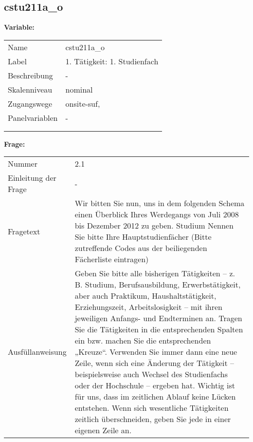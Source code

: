 	
	
	\subsection{cstu211a\_o}
	\label{subSection:cstu211a_o}

	\noindent\textbf{Variable:}\\
		\begin{tabular}{lL{11.3cm}}
			\label{tableVariable:cstu211a_o}
			Name & cstu211a\_o \\
			Label & 1. Tätigkeit: 1. Studienfach \\
			Beschreibung & - \\
			Skalenniveau & nominal \\
			Zugangswege &
				onsite-suf,
 \\
			Panelvariablen & -
			 \\
			 \\
 \\
		\end{tabular}

		\vspace*{1 cm}
		\noindent\textbf{Frage:}\\
		\begin{tabular}{lL{11.3cm}}
			\label{tableQuestion:cstu211a_o}
			Nummer & 2.1 \\
			Einleitung der Frage & - \\
			Fragetext & Wir bitten Sie nun, uns in dem folgenden Schema einen Überblick Ihres Werdegangs von Juli 2008 bis Dezember 2012 zu geben.
Studium
Nennen Sie bitte Ihre Hauptstudienfächer
(Bitte zutreffende Codes aus der beiliegenden Fächerliste eintragen) \\
			Ausfüllanweisung & Geben Sie bitte alle bisherigen Tätigkeiten – z. B. Studium, Berufsausbildung, Erwerbstätigkeit, aber auch Praktikum, Haushaltstätigkeit,
Erziehungszeit, Arbeitslosigkeit – mit ihren jeweiligen Anfangs- und Endterminen an. Tragen Sie die Tätigkeiten in die entsprechenden Spalten ein bzw. machen Sie die entsprechenden „Kreuze“. Verwenden Sie immer dann eine neue Zeile, wenn sich eine Änderung der Tätigkeit – beispielsweise auch Wechsel des Studienfachs oder der Hochschule – ergeben hat. Wichtig ist für uns, dass im zeitlichen Ablauf keine Lücken entstehen. Wenn sich wesentliche Tätigkeiten zeitlich überschneiden, geben Sie jede in einer eigenen Zeile an. \\
		\end{tabular}





